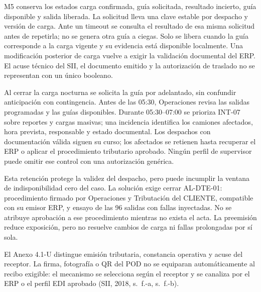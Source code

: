 M5 conserva los estados carga confirmada, guía solicitada, resultado incierto, guía disponible y salida liberada. La solicitud lleva una clave estable por despacho y versión de carga. Ante un timeout se consulta el resultado de esa misma solicitud antes de repetirla; no se genera otra guía a ciegas. Solo se libera cuando la guía corresponde a la carga vigente y su evidencia está disponible localmente. Una modificación posterior de carga vuelve a exigir la validación documental del ERP. El acuse técnico del SII, el documento emitido y la autorización de traslado no se representan con un único booleano.

Al cerrar la carga nocturna se solicita la guía por adelantado, sin confundir anticipación con contingencia. Antes de las 05:30, Operaciones revisa las salidas programadas y las guías disponibles. Durante 05:30--07:00 se prioriza INT-07 sobre reportes y cargas masivas; una incidencia identifica los camiones afectados, hora prevista, responsable y estado documental. Los despachos con documentación válida siguen su curso; los afectados se retienen hasta recuperar el ERP o aplicar el procedimiento tributario aprobado. Ningún perfil de supervisor puede omitir ese control con una autorización genérica.

Esta retención protege la validez del despacho, pero puede incumplir la ventana de indisponibilidad cero del caso. La solución exige cerrar AL-DTE-01: procedimiento firmado por Operaciones y Tributación del CLIENTE, compatible con su emisor ERP, y ensayo de las 96 salidas con fallas inyectadas. No se atribuye aprobación a ese procedimiento mientras no exista el acta. La preemisión reduce exposición, pero no resuelve cambios de carga ni fallas prolongadas por sí sola.

El Anexo 4.1-U distingue emisión tributaria, constancia operativa y acuse del receptor. La firma, fotografía o QR del POD no se equiparan automáticamente al recibo exigible: el mecanismo se selecciona según el receptor y se canaliza por el ERP o el perfil EDI aprobado (SII, 2018, s.~f.-a, s.~f.-b).


